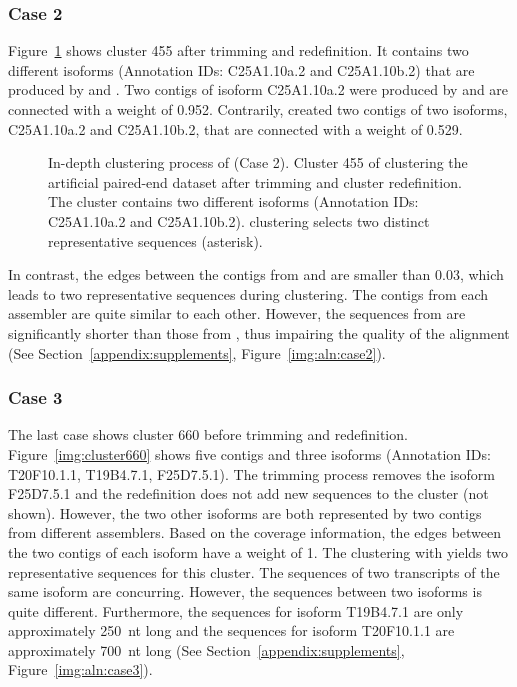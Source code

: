 \documentclass[12pt,a4paper,english]{article}
\begin{document}
	\subsubsection*{Case 2}
	
		Figure~\ref{img:cluster455a} shows cluster 455 after trimming and redefinition. It contains two different isoforms (Annotation IDs: C25A1.10a.2 and C25A1.10b.2) that are produced by \trinity and \soap. 
		Two contigs of isoform C25A1.10a.2 were produced by \soap and are connected with a weight of 0.952. \trinity 
		Contrarily, \trinity created two contigs of two isoforms, C25A1.10a.2 and C25A1.10b.2, that are connected with a weight of 0.529.
		\begin{figure}[H]
			\centering
			\def\svgwidth{0.7\textwidth}
			
			\caption[In-depth clustering process of \karma (Case 2).]{In-depth clustering process of \karma (Case 2). Cluster 455 of clustering the artificial paired-end dataset after trimming and cluster redefinition. The cluster contains two different isoforms (Annotation IDs: C25A1.10a.2 and C25A1.10b.2). \mcl clustering selects two distinct representative sequences (asterisk).}
			\label{img:cluster455a}
		\end{figure}
		In contrast, the edges between the contigs from \soap and \trinity are smaller than 0.03, which leads to two representative sequences during \mcl clustering.
		The contigs from each assembler are quite similar to each other. However, the sequences from \trinity are significantly shorter than those from \soap, thus impairing the quality of the alignment (See Section~\ref{appendix:supplements}, Figure~\ref{img:aln:case2}).
		

		
	\subsubsection*{Case 3}
        The last case shows cluster 660 before trimming and redefinition. Figure~\ref{img:cluster660} shows five contigs and three isoforms (Annotation IDs: T20F10.1.1, T19B4.7.1, F25D7.5.1). The trimming process removes the isoform F25D7.5.1 and the redefinition does not add new sequences to the cluster (not shown).
		However, the two other isoforms are both represented by two contigs from different assemblers. Based on the coverage information, the edges between the two contigs of each isoform have a weight of 1. The clustering with \mcl yields two representative sequences for this cluster. 
		The sequences of two transcripts of the same isoform are concurring.
		However, the sequences between two isoforms is quite different. Furthermore, the sequences for isoform T19B4.7.1 are only approximately 250~nt long and the sequences for isoform T20F10.1.1 are approximately 700~nt long (See Section~\ref{appendix:supplements}, Figure~\ref{img:aln:case3}).
	
\end{document}
